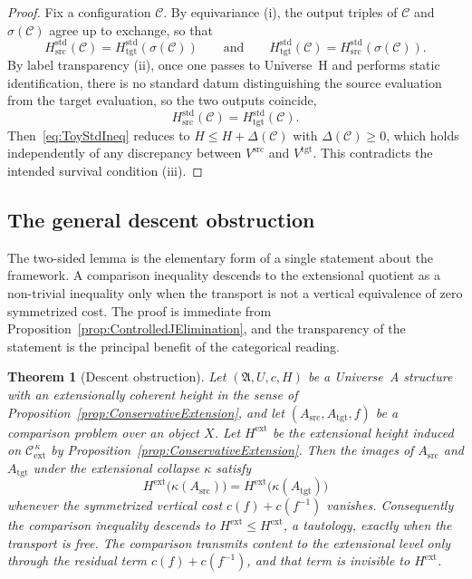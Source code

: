 \documentclass[10pt, reqno]{amsart}
\theoremstyle{plain}
\newtheorem{theorem}{Theorem}[section]
\theoremstyle{definition}
\theoremstyle{plain}
\begin{document}
\begin{proof}
Fix a configuration $\mathcal{C}$. By equivariance (i), the output triples of $\mathcal{C}$ and $\sigma(\mathcal{C})$ agree up to exchange, so that
\[
  H^{\mathrm{std}}_{\mathrm{src}}(\mathcal{C}) = H^{\mathrm{std}}_{\mathrm{tgt}}(\sigma(\mathcal{C}))
  \qquad\text{and}\qquad
  H^{\mathrm{std}}_{\mathrm{tgt}}(\mathcal{C}) = H^{\mathrm{std}}_{\mathrm{src}}(\sigma(\mathcal{C})).
\]
By label transparency (ii), once one passes to Universe~H and performs static identification, there is no standard datum distinguishing the source evaluation from the target evaluation, so the two outputs coincide,
\[
  H^{\mathrm{std}}_{\mathrm{src}}(\mathcal{C}) = H^{\mathrm{std}}_{\mathrm{tgt}}(\mathcal{C}).
\]
Then~\eqref{eq:ToyStdIneq} reduces to $H \le H + \Delta(\mathcal{C})$ with $\Delta(\mathcal{C}) \ge 0$, which holds independently of any discrepancy between $V^{\mathrm{src}}$ and $V^{\mathrm{tgt}}$. This contradicts the intended survival condition (iii).
\end{proof}

\subsection{The general descent obstruction}

The two-sided lemma is the elementary form of a single statement about the framework. A comparison inequality descends to the extensional quotient as a non-trivial inequality only when the transport is not a vertical equivalence of zero symmetrized cost. The proof is immediate from Proposition~\ref{prop:ControlledJElimination}, and the transparency of the statement is the principal benefit of the categorical reading.

\begin{theorem}[Descent obstruction]\label{thm:DescentObstruction}
Let $(\mathfrak{A},U,c,H)$ be a Universe~A structure with an extensionally coherent height in the sense of Proposition~\ref{prop:ConservativeExtension}, and let $(A_{\mathrm{src}}, A_{\mathrm{tgt}}, f)$ be a comparison problem over an object $X$. Let $H^{\mathrm{ext}}$ be the extensional height induced on $\mathcal{C}_{\mathrm{ext}}^{\,\kappa}$ by Proposition~\ref{prop:ConservativeExtension}. Then the images of $A_{\mathrm{src}}$ and $A_{\mathrm{tgt}}$ under the extensional collapse $\kappa$ satisfy
\[
  H^{\mathrm{ext}}\bigl(\kappa(A_{\mathrm{src}})\bigr)
  =
  H^{\mathrm{ext}}\bigl(\kappa(A_{\mathrm{tgt}})\bigr)
\]
whenever the symmetrized vertical cost $c(f) + c(f^{-1})$ vanishes. Consequently the comparison inequality descends to $H^{\mathrm{ext}} \le H^{\mathrm{ext}}$, a tautology, exactly when the transport is free. The comparison transmits content to the extensional level only through the residual term $c(f) + c(f^{-1})$, and that term is invisible to $H^{\mathrm{ext}}$.
\end{theorem}
\end{document}
